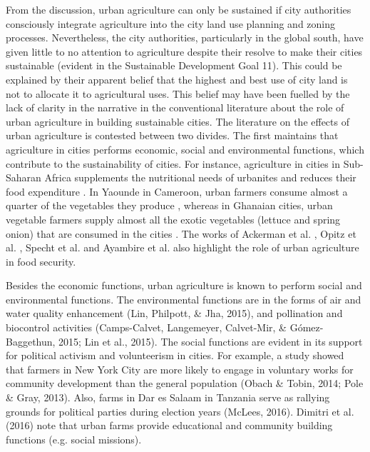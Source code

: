 From the discussion, urban agriculture can only be sustained if city authorities consciously integrate agriculture into the city land use planning and zoning processes. Nevertheless, the city authorities, particularly in the global south, have given little to no attention to agriculture despite their resolve to make their cities sustainable (evident in the Sustainable Development Goal 11). This could be explained by their apparent belief that the highest and best use of city land is not to allocate it to agricultural uses. This belief may have been fuelled by the lack of clarity in the narrative in the conventional literature about the role of urban agriculture in building sustainable cities. The literature on the effects of urban agriculture is contested between two divides. The first maintains that agriculture in cities performs economic, social and environmental functions, which contribute to the sustainability of cities. For instance, agriculture in cities in Sub-Saharan Africa supplements the nutritional needs of urbanites and reduces their food expenditure \cite{Binns2013}. In Yaounde in Cameroon, urban farmers consume almost a quarter of the vegetables they produce \cite{Prain2010}, whereas in Ghanaian cities, urban vegetable farmers supply almost all the exotic vegetables (lettuce and spring onion) that are consumed in the cities \cite{Kodjo2014, Drechsel2014}. The works of Ackerman et al. \cite{Ackerman2014}, Opitz et al. \cite{Opitz2016}, Specht et al. \cite{Specht2014} and Ayambire et al. \cite{Ayambire2019} also highlight the role of urban agriculture in food security.

Besides the economic functions, urban agriculture is known to perform social and environmental functions. The environmental functions are in the forms of air and water quality enhancement (Lin, Philpott, \& Jha, 2015), and pollination and biocontrol activities (Camps-Calvet, Langemeyer, Calvet-Mir, \& Gómez-Baggethun, 2015; Lin et al., 2015). The social functions are evident in its support for political activism and volunteerism in cities. For example, a study showed that farmers in New York City are more likely to engage in voluntary works for community development than the general population (Obach \& Tobin, 2014; Pole \& Gray, 2013). Also, farms in Dar es Salaam in Tanzania serve as rallying grounds for political parties during election years (McLees, 2016). Dimitri et al. (2016) note that urban farms provide educational and community building functions (e.g. social missions).

